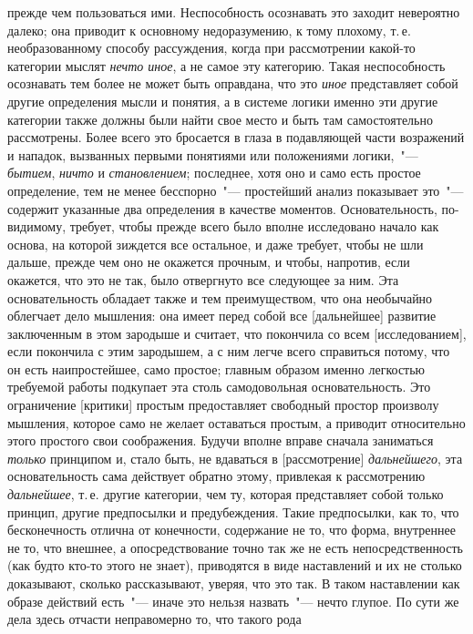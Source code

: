 прежде чем пользоваться ими. Неспособность
осознавать это заходит невероятно далеко; она приводит
к основному недоразумению, к тому плохому, т.\,е. необразованному
способу рассуждения, когда при рассмотрении
какой-то категории мыслят \emph{нечто иное}, а не самое
эту категорию. Такая неспособность осознавать тем более
не может быть оправдана, что это \emph{иное} представляет собой
другие определения мысли и понятия, а в системе
логики именно эти другие категории также должны были
найти свое место и быть там самостоятельно рассмотрены.
Более всего это бросается в глаза в подавляющей части
возражений и нападок, вызванных первыми понятиями
или положениями логики,~"--- \emph{бытием}, \emph{ничто} и \emph{становлением};
последнее, хотя оно и само есть простое определение,
тем не менее бесспорно~"--- простейший анализ показывает
это~"--- содержит указанные два определения в качестве
моментов. Основательность, по-видимому, требует,
чтобы прежде всего было вполне исследовано начало как
основа, на которой зиждется все остальное, и даже требует,
чтобы не шли дальше, прежде чем оно не окажется
прочным, и чтобы, напротив, если окажется, что это не
так, было отвергнуто все следующее за ним. Эта основательность
обладает также и тем преимуществом, что она
необычайно облегчает дело мышления: она имеет перед
собой все [дальнейшее] развитие заключенным в этом зародыше
и считает, что покончила со всем [исследованием],
если покончила с этим зародышем, а с ним легче всего
справиться потому, что он есть наипростейшее, само простое;
главным образом именно легкостью требуемой работы
подкупает эта столь самодовольная основательность.
Это ограничение [критики] простым предоставляет свободный
простор произволу мышления, которое само не
желает оставаться простым, а приводит относительно
этого простого свои соображения. Будучи вполне вправе
сначала заниматься \emph{только} принципом и, стало быть, не
вдаваться в [рассмотрение] \emph{дальнейшего}, эта основательность
сама действует обратно этому, привлекая к рассмотрению
\emph{дальнейшее}, т.\,е. другие категории, чем ту, которая
представляет собой только принцип, другие предпосылки
и предубеждения. Такие предпосылки, как то, что бесконечность
отлична от конечности, содержание не то, что
форма, внутреннее не то, что внешнее, а опосредствование
точно так же не есть непосредственность (как будто
кто-то этого не знает), приводятся в виде наставлений и
их не столько доказывают, сколько рассказывают, уверяя,
что это так. В таком наставлении как образе действий
есть~"--- иначе это нельзя назвать~"--- нечто глупое. По сути
же дела здесь отчасти неправомерно то, что такого рода
